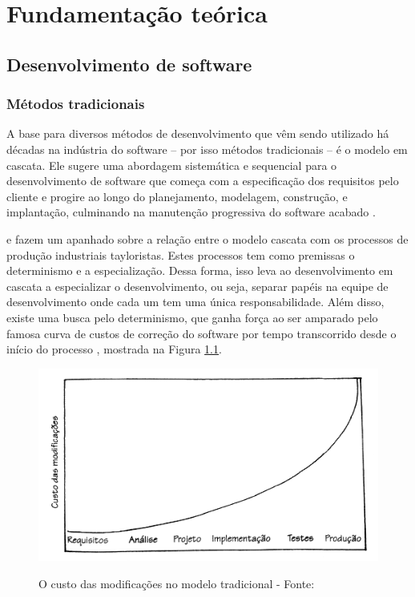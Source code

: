 \chapter{Fundamentação teórica}

\section{Desenvolvimento de software} %
\label{sec:desenvolvimento_de_software}


\subsection{Métodos tradicionais} %
\label{sub:metodos_tradicionais}

A base para diversos métodos de desenvolvimento que vêm sendo utilizado há décadas na indústria do software – por isso métodos tradicionais – é o modelo em cascata. Ele sugere uma abordagem sistemática e sequencial para o desenvolvimento de software que começa com a especificação dos requisitos pelo cliente e progire ao longo do planejamento, modelagem, construção, e implantação, culminando na manutenção progressiva do software acabado \cite{Pressman}.

 e  fazem um apanhado sobre a relação entre o modelo cascata com os processos de produção industriais tayloristas. Estes processos tem como premissas o determinismo e a especialização. Dessa forma, isso leva ao desenvolvimento em cascata a especializar o desenvolvimento, ou seja, separar papéis na equipe de desenvolvimento onde cada um tem uma única responsabilidade. Além disso, existe uma busca pelo determinismo, que ganha força ao ser amparado pelo famosa curva de custos de correção do software por tempo transcorrido desde o início do processo \cite{Boehm}, mostrada na Figura \ref{img:custo-cascata}.

\begin{figure}[h]
  \center
  \caption{O custo das modificações no modelo tradicional - Fonte: \cite{XPKent}}
  \includegraphics[scale=0.35]{images/custo-cascata}
  \label{img:custo-cascata}
\end{figure}


